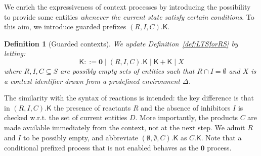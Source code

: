 \documentclass[sn-mathphys-num,a4paper,iicol,lineno,pdflatex]{sn-jnl-hacked}
\newcommand{\nil}{\mathbf{0}}
\newcommand{\obs}[2]{\langle #1\vartriangleright #2\rangle}
\theoremstyle{thmstyleone}%
\newtheorem{theorem}{Theorem}%
\theoremstyle{thmstyletwo}%
\theoremstyle{thmstylethree}%
\newtheorem{definition}{Definition}%
\begin{document}

We enrich the expressiveness of context processes by introducing the possibility to provide some entities \emph{whenever the current state satisfy certain conditions}.
To this aim, we introduce guarded prefixes $(R,I,C).\mathsf{K}$. 
%
\begin{definition}[Guarded contexts]
We update Definition~\ref{def:LTSforRS} by letting:
\[\mathsf{K}::=\nil \mid (R,I,C).\mathsf{K} \mid \mathsf{K}+\mathsf{K} \mid X
\]
\noindent
where $R,I,C\subseteq S$ are possibly empty sets of entities such that $R\cap I=\emptyset$ and $X$ is a context identifier drawn from a predefined environment $\Delta$.
\end{definition}

The similarity with the syntax of reactions is intended: the key difference is that in $(R,I,C).\mathsf{K}$ the presence of reactants $R$ and the absence of inhibitors $I$ is checked w.r.t. the set of current entities $D$.
More importantly, the products $C$ are made available immediately from the context, not at the next step.
We admit $R$ and $I$ to be possibly empty, and abbreviate $(\emptyset,\emptyset,C).\mathsf{K}$ as $C.\mathsf{K}$.
Note that a conditional prefixed process that is not enabled behaves as the $\nil$ process.
%
\end{document}
